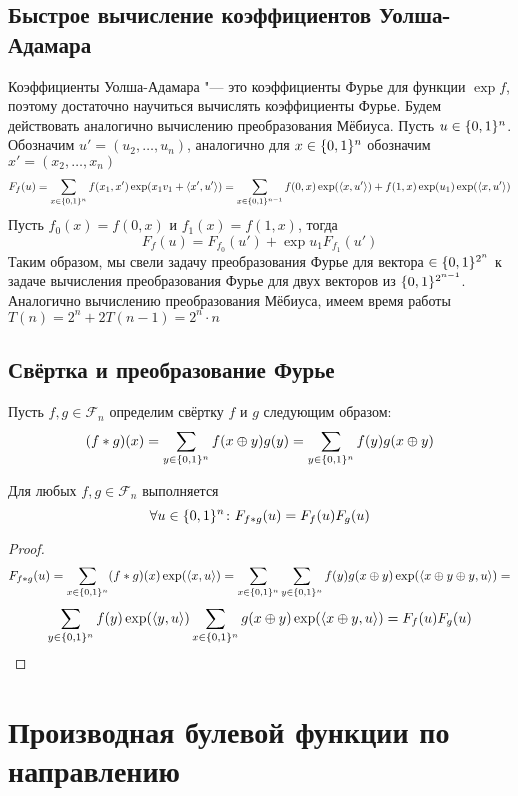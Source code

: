 \subsection{Быстрое вычисление коэффициентов Уолша-Адамара}

Коэффициенты Уолша-Адамара "--- это коэффициенты Фурье для функции
$\exp f$, поэтому достаточно научиться вычислять коэффициенты Фурье.
Будем действовать аналогично вычислению преобразования Мёбиуса.
Пусть $u \in \{0,1\}^n$. Обозначим $u' = (u_2, \ldots, u_n)$, аналогично для
$x \in \{0,1\}^n$ обозначим $x' = (x_2, \ldots, x_n)$
$$F_f (u) = \sum\limits_{x \in \{0,1\}^n} f(x_1, x') \exp (x_1 v_1 + \langle x', u' \rangle)
 = \sum\limits_{x \in \{0,1\}^{n-1}} f(0, x) \exp(\langle x, u' \rangle)
 + f(1, x) \exp(u_1) \exp(\langle x, u' \rangle)$$
Пусть $f_0(x) = f(0, x)$ и $f_1(x) = f(1,x)$, тогда
$$F_f(u) = F_{f_0} (u') + \exp{u_1} F_{f_1} (u')$$
Таким образом, мы свели задачу преобразования Фурье для вектора
$\in \{0,1\}^{2^n}$ к задаче вычисления преобразования Фурье для двух 
векторов из $\{0,1\}^{2^{n-1}}$. Аналогично вычислению преобразования
Мёбиуса, имеем время работы $T(n) = 2^n + 2T(n-1) = 2^n \cdot n$

\subsection{Свёртка и преобразование Фурье}
\begin{definition}
Пусть $f,g \in \mathscr{F}_n$ определим свёртку $f$ и $g$ следующим образом:
$$(f * g) (x) = \sum\limits_{y \in \{0,1\}^n} f(x \oplus y) g(y) = 
   \sum\limits_{y \in \{0,1\}^n} f(y) g(x \oplus y)$$
\end{definition}

\begin{theorem}
\label{fourier_convolution}
Для любых $f,g \in \mathscr{F}_n$ выполняется
$$\forall u \in \{0,1\}^n \colon F_{f * g} (u) = F_f (u) F_g (u)$$
\end{theorem}

\begin{proof}
$$F_{f*g}(u) = \sum\limits_{x \in \{0,1\}^n} (f * g) (x) \exp (\langle x,u \rangle)
= \sum\limits_{x \in \{0,1\}^n} \sum\limits_{y \in \{0,1\}^n} f(y)  g(x \oplus y)
  \exp(\langle x\oplus y \oplus y,u \rangle) = $$
  $$\sum\limits_{y \in \{0,1\}^n} f(y) \exp(\langle y, u\rangle) 
  \sum\limits_{x \in \{0,1\}^n} g(x \oplus y) \exp(\langle x\oplus y, u\rangle)
  = F_{f} (u) F_{g} (u)$$
\end{proof}

\section{Производная булевой функции по направлению}

